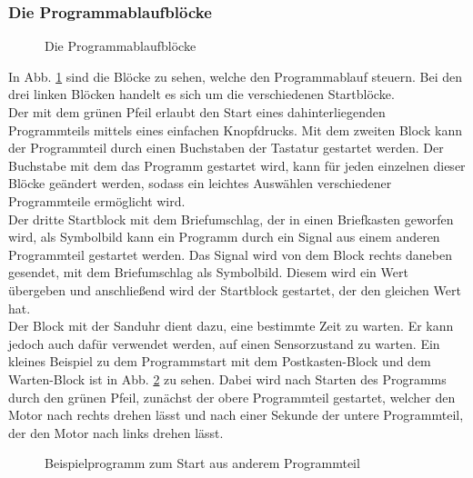 \subsubsection{Die Programmablaufblöcke}
\begin{figure}[htbp!]
	\centering
	\caption[Die Programmablaufblöcke]{Die Programmablaufblöcke} %
	\label{img:Programmablaufblöcke}
\end{figure}
In Abb. \ref{img:Programmablaufblöcke} sind die Blöcke zu sehen, welche den Programmablauf steuern. Bei den drei linken Blöcken handelt es sich um die verschiedenen Startblöcke.\\
Der mit dem grünen Pfeil erlaubt den Start eines dahinterliegenden Programmteils mittels eines einfachen Knopfdrucks. Mit dem zweiten Block kann der Programmteil durch einen Buchstaben der Tastatur gestartet werden. Der Buchstabe mit dem das Programm gestartet wird, kann für jeden einzelnen dieser Blöcke geändert werden, sodass ein leichtes Auswählen verschiedener Programmteile ermöglicht wird.\\
Der dritte Startblock mit dem Briefumschlag, der in einen Briefkasten geworfen wird, als Symbolbild kann ein Programm durch ein Signal aus einem anderen Programmteil gestartet werden. Das Signal wird von dem Block rechts daneben gesendet, mit dem Briefumschlag als Symbolbild. Diesem wird ein Wert übergeben und anschließend wird der Startblock gestartet, der den gleichen Wert hat. \\
Der Block mit der Sanduhr dient dazu, eine bestimmte Zeit zu warten. Er kann jedoch auch dafür verwendet werden, auf einen Sensorzustand zu warten. Ein kleines Beispiel zu dem Programmstart mit dem Postkasten-Block und dem Warten-Block ist in Abb. \ref{img:Beispiel_01} zu sehen. Dabei wird nach Starten des Programms durch den grünen Pfeil, zunächst der obere Programmteil gestartet, welcher den Motor nach rechts drehen lässt und nach einer Sekunde der untere Programmteil, der den Motor nach links drehen lässt. 



\begin{figure}[htbp!]
	\centering
	\caption[Beispielprogramm zum Start aus anderem Programmteil]{Beispielprogramm zum Start aus anderem Programmteil} %
	\label{img:Beispiel_01}
\end{figure}

